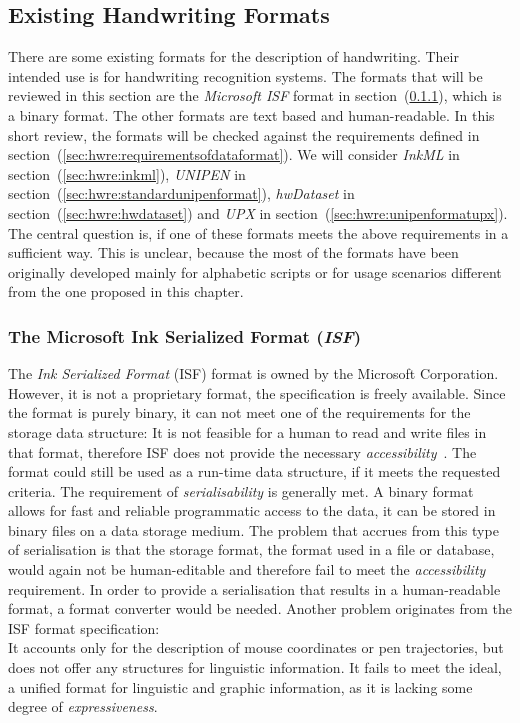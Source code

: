 

\subsection{Existing Handwriting Formats}
\label{sec:hwre:existingformats}

There are some existing formats for the description of handwriting. Their 
intended use is for handwriting recognition systems. The formats that will be
reviewed in this section are the \emph{Microsoft ISF} format in 
section~(\ref{sec:hwre:msisfformat}), which is a binary format.
The other formats are text based and human-readable. In this short review,
the formats will be checked against the requirements defined in 
section~(\ref{sec:hwre:requirementsofdataformat}). We will consider 
\emph{InkML} in section~(\ref{sec:hwre:inkml}), 
\emph{UNIPEN} in section~(\ref{sec:hwre:standardunipenformat}), 
\emph{hwDataset} in section~(\ref{sec:hwre:hwdataset}) and 
\emph{UPX} in section~(\ref{sec:hwre:unipenformatupx}). 
The central question is, if one of these formats meets the above requirements in 
a sufficient way. This is unclear, because the most of the formats have been 
originally developed mainly for alphabetic scripts or for usage scenarios 
different from the one proposed in this chapter.

\subsubsection{The Microsoft Ink Serialized Format (\emph{ISF})}
\label{sec:hwre:msisfformat}

The \emph{Ink Serialized Format} (ISF) format is owned by the 
Microsoft Corporation. However, it is not a proprietary format, the 
specification is freely available. Since the format is purely binary, 
it can not meet one of the requirements for the storage data structure:
It is not feasible for a human to read and write files in that format,
therefore ISF does not provide the necessary 
\emph{accessibility}~. The format could still be used 
as a run-time data structure, if it meets the requested criteria.
The requirement of \emph{serialisability} is generally met. A binary format 
allows for fast and reliable programmatic access to the data, it can be stored
in binary files on a data storage medium. The problem that accrues from this 
type of serialisation is that the storage format, the format used in a file or 
database, would again not be human-editable and therefore fail to meet the 
\emph{accessibility} requirement. 
In order to provide a serialisation that results in a human-readable format, 
a format converter would be needed. Another problem originates from the 
ISF format specification: \\
It accounts only for the description of mouse coordinates or pen trajectories, 
but does not offer any structures for linguistic information. 
It fails to meet the ideal, a unified format for linguistic and graphic 
information, as it is lacking some degree of \emph{expressiveness}.


